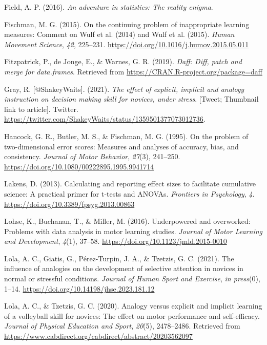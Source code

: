 \documentclass[
  english,
  man, donotrepeattitle,floatsintext]{apa7}
\newlength{\cslhangindent}
\newlength{\cslentryspacingunit} %
\newenvironment{CSLReferences}[2] %
 {%
  \setlength{\parindent}{0pt}
  \ifodd #1
  \let\oldpar\par
  \def\par{\hangindent=\cslhangindent\oldpar}
  \fi
  \setlength{\parskip}{#2\cslentryspacingunit}
 }%
 {}
\begin{document}
\begin{CSLReferences}{1}{0}
\leavevmode{}%
Field, A. P. (2016). \emph{An adventure in statistics: The reality enigma}.

\leavevmode{}%
Fischman, M. G. (2015). On the continuing problem of inappropriate learning measures: Comment on Wulf et al. (2014) and Wulf et al. (2015). \emph{Human Movement Science}, \emph{42}, 225--231. \url{https://doi.org/10.1016/j.humov.2015.05.011}

\leavevmode{}%
Fitzpatrick, P., de Jonge, E., \& Warnes, G. R. (2019). \emph{Daff: Diff, patch and merge for data.frames}. Retrieved from \url{https://CRAN.R-project.org/package=daff}

\leavevmode{}%
Gray, R. {[}@ShakeyWaits{]}. (2021). \emph{The effect of explicit, implicit and analogy instruction on decision making skill for novices, under stress}. {[}Tweet; Thumbnail link to article{]}. Twitter. \url{https://twitter.com/ShakeyWaits/status/1359501377073012736}.

\leavevmode{}%
Hancock, G. R., Butler, M. S., \& Fischman, M. G. (1995). On the problem of two-dimensional error scores: Measures and analyses of accuracy, bias, and consistency. \emph{Journal of Motor Behavior}, \emph{27}(3), 241--250. \url{https://doi.org/10.1080/00222895.1995.9941714}

\leavevmode{}%
Lakens, D. (2013). Calculating and reporting effect sizes to facilitate cumulative science: A practical primer for t-tests and ANOVAs. \emph{Frontiers in Psychology}, \emph{4}. \url{https://doi.org/10.3389/fpsyg.2013.00863}

\leavevmode{}%
Lohse, K., Buchanan, T., \& Miller, M. (2016). Underpowered and overworked: Problems with data analysis in motor learning studies. \emph{Journal of Motor Learning and Development}, \emph{4}(1), 37--58. \url{https://doi.org/10.1123/jmld.2015-0010}

\leavevmode{}%
Lola, A. C., Giatis, G., Pérez-Turpin, J. A., \& Tzetzis, G. C. (2021). The influence of analogies on the development of selective attention in novices in normal or stressful conditions. \emph{Journal of Human Sport and Exercise}, \emph{in press}(0), 1--14. \url{https://doi.org/10.14198/jhse.2023.181.12}

\leavevmode{}%
Lola, A. C., \& Tzetzis, G. C. (2020). Analogy versus explicit and implicit learning of a volleyball skill for novices: The effect on motor performance and self-efficacy. \emph{Journal of Physical Education and Sport}, \emph{20}(5), 2478--2486. Retrieved from \url{https://www.cabdirect.org/cabdirect/abstract/20203562097}


\end{CSLReferences}
\end{document}
